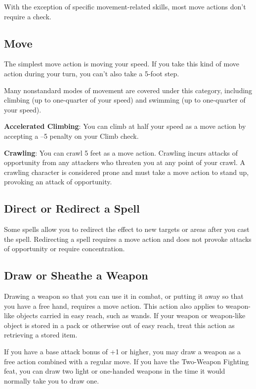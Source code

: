 				
With the exception of specific movement-related skills, most move actions don't require a check.
				
\subsection{Move}

				
The simplest move action is moving your speed. If you take this kind of move action during your turn, you can't also take a 5-foot step.
				
Many nonstandard modes of movement are covered under this category, including climbing (up to one-quarter of your speed) and swimming (up to one-quarter of your speed).
				
\textbf{Accelerated Climbing}: You can climb at half your speed as a move action by accepting a --5 penalty on your Climb check.
				
\textbf{Crawling}: You can crawl 5 feet as a move action. Crawling incurs attacks of opportunity from any attackers who threaten you at any point of your crawl. A crawling character is considered prone and must take a move action to stand up, provoking an attack of opportunity.
				
\subsection{Direct or Redirect a Spell}

				
Some spells allow you to redirect the effect to new targets or areas after you cast the spell. Redirecting a spell requires a move action and does not provoke attacks of opportunity or require concentration.
				
\subsection{Draw or Sheathe a Weapon}

				
Drawing a weapon so that you can use it in combat, or putting it away so that you have a free hand, requires a move action. This action also applies to weapon-like objects carried in easy reach, such as wands. If your weapon or weapon-like object is stored in a pack or otherwise out of easy reach, treat this action as retrieving a stored item.
				
If you have a base attack bonus of +1 or higher, you may draw a weapon as a free action combined with a regular move. If you have the Two-Weapon Fighting feat, you can draw two light or one-handed weapons in the time it would normally take you to draw one.
				
